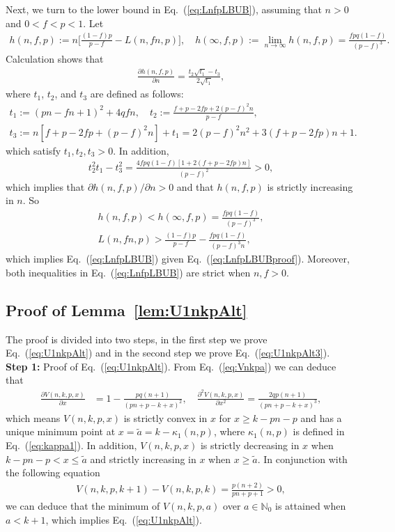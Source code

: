 \documentclass[aop]{imsart}
\theoremstyle{plain}
\theoremstyle{remark}
\newcommand{\bbN}{\mathbb{N}}
\newcommand{\1}{\operatorname{\uppercase\expandafter{\romannumeral1}}}
\newcommand{\2}{\operatorname{\uppercase\expandafter{\romannumeral2}}}
\newcommand{\3}{\operatorname{\uppercase\expandafter{\romannumeral3}}}
\newcommand{\4}{\operatorname{\uppercase\expandafter{\romannumeral4}}}
\newcommand{\5}{\operatorname{\uppercase\expandafter{\romannumeral5}}}
\newcommand{\6}{\operatorname{\uppercase\expandafter{\romannumeral6}}}
\newcommand{\7}{\operatorname{\uppercase\expandafter{\romannumeral7}}}
\newcommand{\8}{\operatorname{\uppercase\expandafter{\romannumeral8}}}
\newcommand{\9}{\operatorname{\uppercase\expandafter{\romannumeral9}}}
\newcommand{\eref}[1]{Eq.~\textup{(\ref{#1})}}
\newcommand{\lref}[1]{Lemma~\ref{#1}}
\begin{document}
\begin{appendix}
	
	Next, we turn to the lower bound in 	\eref{eq:LnfpLBUB}, assuming that $n>0$ and $0<f<p<1$. Let 
	\begin{align}
	h(n,f,p):=n\biggl[\frac{(1-f)p}{p-f}-L(n,f n,p)\biggr],\quad  
	h(\infty,f,p):=\lim_{n\to \infty}h(n,f,p)=\frac{fpq(1-f) }{(p-f)^3}.
	\end{align}
Calculation shows that
	\begin{align}
	\frac{\partial h(n,f,p)}{\partial n}=\frac{t_2 \sqrt{t_1}-t_3}{2\sqrt{t_1}},
	\end{align}
	where $t_1$, $t_2$, and $t_3$ are defined as follows:
	\begin{gather}
	t_1 :=(p n-f n+1)^2+4q f n, \quad t_2 :=\frac{f+p-2f p +2(p-f)^2n}{p-f},\\
	t_3 :=n[f+p-2f p +(p-f)^2n]+t_1=2(p-f)^2n^2+3(f+p-2f p)n+1. 
	\end{gather}
which satisfy $t_1, t_2, t_3>0$. In addition,
	\begin{align}
	t_2^2 t_1-t_3^2=\frac{4fpq (1-f) [1+2(f+p-2fp )n]}{(p-f)^2}> 0,
	\end{align}
	which implies that $\partial h(n,f,p)/\partial n>0$ and that $h(n,f,p)$ is strictly increasing in $n$. So 
	\begin{align}
	h(n,f,p)< h(\infty,f,p)=\frac{fpq(1-f) }{(p-f)^3},\\
	L(n,f n,p)> \frac{(1-f)p}{p-f}-\frac{fpq(1-f) }{(p-f)^3n},
	\end{align}	
	which implies \eref{eq:LnfpLBUB} given \eref{eq:LnfpLBUBproof}. Moreover,  both inequalities  in \eref{eq:LnfpLBUB} are strict when $n, f>0$. 


\subsection{Proof of \lref{lem:U1nkpAlt}}
The proof is divided into two steps, in the first step we prove \eref{eq:U1nkpAlt} and in the second step we prove \eref{eq:U1nkpAlt3}.\\


\textbf{Step 1:} Proof of \eref{eq:U1nkpAlt}. From \eref{eq:Vnkpa} we can deduce that
\begin{align}
\frac{\partial V(n,k,p,x)}{\partial x}&=1-\frac{p q (n+1)}{(p n+p-k+x)^2},\quad 
\frac{\partial^2 V(n,k,p,x)}{\partial x^2}=\frac{2q p (n+1)}{(p n+p-k+x)^3},
\end{align}
which means $V(n,k,p,x)$ is strictly convex in $x$ for $x\geq k-p n-p$  and has a unique minimum point at $x=\tilde{a}=k-\kappa_1(n,p)$, where $\kappa_1(n,p)$ is defined in \eref{eq:kappa1}. In addition, $V(n,k,p,x)$ is strictly decreasing in $x$ when $k-p n-p<x\leq \tilde{a}$ and strictly increasing in $x$ when  $x\geq \tilde{a}$. In conjunction with the  following equation
\begin{align}\label{eq:Vk+1k}
V(n,k,p,k+1)-V(n,k,p,k)=\frac{p(n+2)}{p n+p +1}>0,
\end{align}
we can deduce that the minimum of $V(n,k,p,a)$ over $a\in \bbN_0$ is attained when $a< k+1$, which implies  \eref{eq:U1nkpAlt}.\\


\end{appendix}
\end{document}
